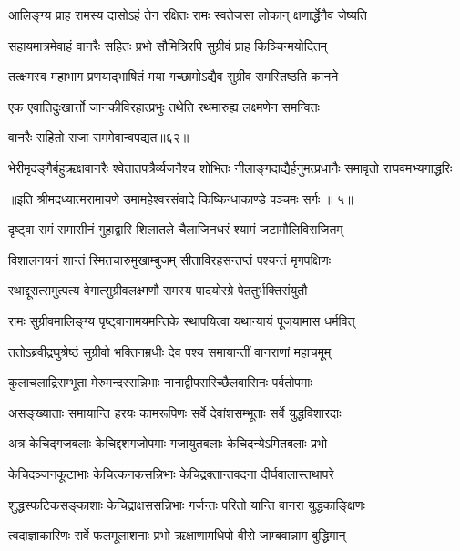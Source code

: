 \twolineshloka
{आलिङ्ग्य प्राह रामस्य दासोऽहं तेन रक्षितः}
{रामः स्वतेजसा लोकान् क्षणार्द्धेनैव जेष्यति} %

\twolineshloka
{सहायमात्रमेवाहं वानरैः सहितः प्रभो}
{सौमित्रिरपि सुग्रीवं प्राह किञ्चिन्मयोदितम्} %

\twolineshloka
{तत्क्षमस्व महाभाग प्रणयाद्भाषितं मया}
{गच्छामोऽद्यैव सुग्रीव रामस्तिष्ठति कानने} %

\twolineshloka
{एक एवातिदुःखार्त्तो जानकीविरहात्प्रभुः}
{तथेति रथमारुह्य लक्ष्मणेन समन्वितः} %

{वानरैः सहितो राजा राममेवान्वपद्यत॥६२॥} %


\twolineshloka
{भेरीमृदङ्गैर्बहुऋक्षवानरैः श्वेतातपत्रैर्व्यजनैश्च शोभितः}
{नीलाङ्गदाद्यैर्हनुमत्प्रधानैः समावृतो राघवमभ्यगाद्धरिः} %

{॥इति श्रीमदध्यात्मरामायणे उमामहेश्वरसंवादे किष्किन्धाकाण्डे
पञ्चमः सर्गः ॥ ५॥
}




\twolineshloka
{दृष्ट्वा रामं समासीनं गुहाद्वारि शिलातले}
{चैलाजिनधरं श्यामं जटामौलिविराजितम्} %

\twolineshloka
{विशालनयनं शान्तं स्मितचारुमुखाम्बुजम्}
{सीताविरहसन्तप्तं पश्यन्तं मृगपक्षिणः} %

\twolineshloka
{रथाद्दूरात्समुत्पत्य वेगात्सुग्रीवलक्ष्मणौ}
{रामस्य पादयोरग्रे पेततुर्भक्तिसंयुतौ} %

\twolineshloka
{रामः सुग्रीवमालिङ्ग्य पृष्ट्वानामयमन्तिके}
{स्थापयित्वा यथान्यायं पूजयामास धर्मवित्} %

\twolineshloka
{ततोऽब्रवीद्रघुश्रेष्ठं सुग्रीवो भक्तिनम्रधीः}
{देव पश्य समायान्तीं वानराणां महाचमूम्} %

\twolineshloka
{कुलाचलाद्रिसम्भूता मेरुमन्दरसन्निभाः}
{नानाद्वीपसरिच्छैलवासिनः पर्वतोपमाः} %

\twolineshloka
{असङ्ख्याताः समायान्ति हरयः कामरूपिणः}
{सर्वे देवांशसम्भूताः सर्वे युद्धविशारदाः} %

\twolineshloka
{अत्र केचिद्गजबलाः केचिद्दशगजोपमाः}
{गजायुतबलाः केचिदन्येऽमितबलाः प्रभो} %

\twolineshloka
{केचिदञ्जनकूटाभाः केचित्कनकसन्निभाः}
{केचिद्रक्तान्तवदना दीर्घवालास्तथापरे} %

\twolineshloka
{शुद्धस्फटिकसङ्काशाः केचिद्राक्षससन्निभाः}
{गर्जन्तः परितो यान्ति वानरा युद्धकाङ्क्षिणः} %

\twolineshloka
{त्वदाज्ञाकारिणः सर्वे फलमूलाशनाः प्रभो}
{ऋक्षाणामधिपो वीरो जाम्बवान्नाम बुद्धिमान्} %

